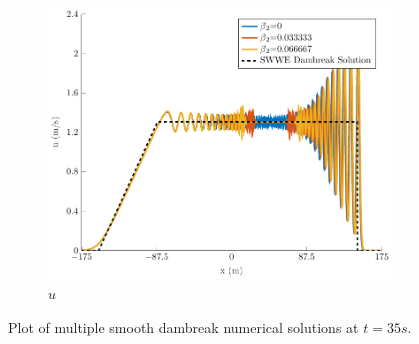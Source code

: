 \documentclass[10pt]{article}
\begin{document}
\begin{figure}
\begin{subfigure}{0.32\textwidth}
	\includegraphics[width=\textwidth]{./Figures/Simulations/Study/ImpDisp/u.pdf}
	\caption{$u$}
	\end{subfigure}
	\caption{Plot of multiple smooth dambreak numerical solutions at $t=35s$.}
\end{figure}
\end{document}
